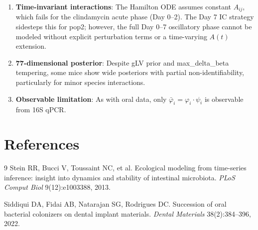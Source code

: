 \documentclass[11pt,a4paper]{article}
\begin{document}
\begin{enumerate}
\item \textbf{Time-invariant interactions}: The Hamilton ODE assumes
constant $A_{ij}$, which fails for the clindamycin acute phase (Day 0--2).
The Day 7 IC strategy sidesteps this for pop2; however, the full Day 0--7
oscillatory phase cannot be modeled without explicit perturbation terms or
a time-varying $A(t)$ extension.

\item \textbf{77-dimensional posterior}: Despite gLV prior and
max\_delta\_beta tempering, some mice show wide posteriors with
partial non-identifiability, particularly for minor species interactions.

\item \textbf{Observable limitation}: As with oral data, only
$\bar{\varphi}_i = \varphi_i \cdot \psi_i$ is observable from 16S qPCR.
\end{enumerate}

\section*{References}

\begin{thebibliography}{9}
Stein RR, Bucci V, Toussaint NC, et al.
Ecological modeling from time-series inference: insight into dynamics
and stability of intestinal microbiota.
\textit{PLoS Comput Biol} 9(12):e1003388, 2013.

Siddiqui DA, Fidai AB, Natarajan SG, Rodrigues DC.
Succession of oral bacterial colonizers on dental implant materials.
\textit{Dental Materials} 38(2):384--396, 2022.
\end{thebibliography}
\end{document}

